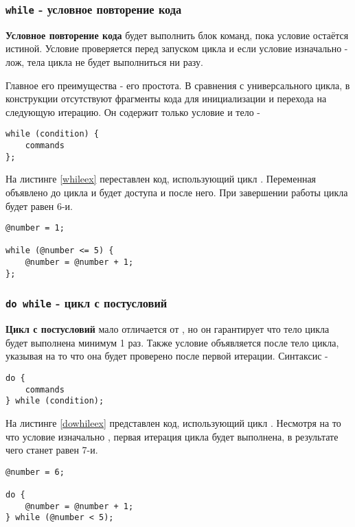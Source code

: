 \documentclass[a4paper, 14pt]{extarticle}
\begin{document}
\subsubsection{\lstinline`while` - условное повторение кода}

{\bf Условное повторение кода} будет выполнить блок команд, пока условие остаётся истиной. Условие проверяется перед запуском цикла и если условие изначально - лож, тела цикла не будет выполниться ни разу.

Главное его преимущества - его простота. В сравнения с универсального цикла, в конструкции  отсутствуют фрагменты кода для инициализации и перехода на следующую итерацию. Он содержит только условие и тело -
\begin{lstlisting}[numbers=none]
while (condition) {
	commands
};
\end{lstlisting}

На листинге \ref{whileex} переставлен код, использующий цикл . Переменная  объявлено до цикла и будет доступа и после него. При завершении работы цикла  будет равен 6-и.

\begin{lstlisting}[caption=Цикл while, label=whileex]
@number = 1;

while (@number <= 5) {
	@number = @number + 1;
};
\end{lstlisting}

\subsubsection{\lstinline`do while` - цикл с постусловий}

{\bf Цикл с постусловий} мало отличается от , но он гарантирует что тело цикла будет выполнена минимум 1 раз. Также условие объявляется после тело цикла, указывая на то что она будет проверено после первой итерации. Синтаксис -
\begin{lstlisting}[numbers=none]
do {
	commands
} while (condition);
\end{lstlisting}

На листинге \ref{dowhileex} представлен код, использующий цикл . Несмотря на то что условие изначально , первая итерация цикла будет выполнена, в результате чего  станет равен 7-и.

\begin{lstlisting}[caption=Цикл do while, label=dowhileex]
@number = 6;

do {
	@number = @number + 1;
} while (@number < 5);
\end{lstlisting}
\end{document}
